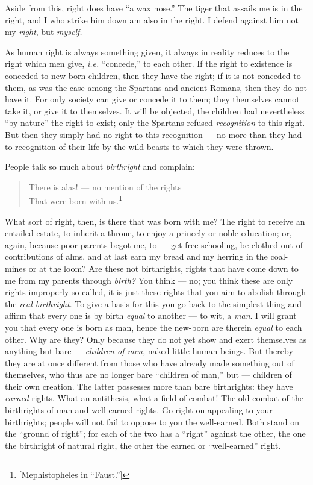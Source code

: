 Aside from this, right does have ``a wax nose.'' The tiger that assails me 
is in the right, and I who strike him down am also in the right. I defend 
against him not my \textit{right}, but \textit{myself.}

As human right is always something given, it always in reality reduces to the 
right which men give, \textit{i.e.} ``concede,'' to each other. If the right 
to existence is conceded to new-born children, then they have the right; if it 
is not conceded to them, as was the case among the Spartans and ancient 
Romans, then they do not have it. For only society can give or concede it to 
them; they themselves cannot take it, or give it to themselves. It will be 
objected, the children had nevertheless ``by nature'' the right to exist; 
only the Spartans refused \textit{recognition} to this right. But then they 
simply had no right to this recognition --- no more than they had to 
recognition of their life by the wild beasts to which they were thrown.

People talk so much about \textit{birthright} and complain:

\begin{quotation}

\noindent{} There is alas! --- no mention of the rights\\
 That were born with us.\footnote{[Mephistopheles in ``Faust.'']} 
\end{quotation}

\noindent{}What sort of right, then, is there that was born with me? The right 
to receive an entailed estate, to inherit a throne, to enjoy a princely or 
noble education; or, again, because poor parents begot me, to --- get free 
schooling, be clothed out of contributions of alms, and at last earn my bread 
and my herring in the coal-mines or at the loom? Are these not birthrights, 
rights that have come down to me from my parents through \textit{birth?} You 
think --- no; you think these are only rights improperly so called, it is just 
these rights that you aim to abolish through the \textit{real birthright}. To 
give a basis for this you go back to the simplest thing and affirm that every 
one is by birth \textit{equal} to another --- to wit, a \textit{man}. I will 
grant you that every one is born as man, hence the new-born are therein 
\textit{equal} to each other. Why are they? Only because they do not yet show 
and exert themselves as anything but bare --- \textit{children of men}, naked 
little human beings. But thereby they are at once different from those who 
have already made something out of themselves, who thus are no longer bare 
``children of man,'' but --- children of their own creation. The latter 
possesses more than bare birthrights: they have \textit{earned} rights. What 
an antithesis, what a field of combat! The old combat of the birthrights of 
man and well-earned rights. Go right on appealing to your birthrights; people 
will not fail to oppose to you the well-earned. Both stand on the ``ground of 
right''; for each of the two has a ``right'' against the other, the one the 
birthright of natural right, the other the earned or ``well-earned'' right.

